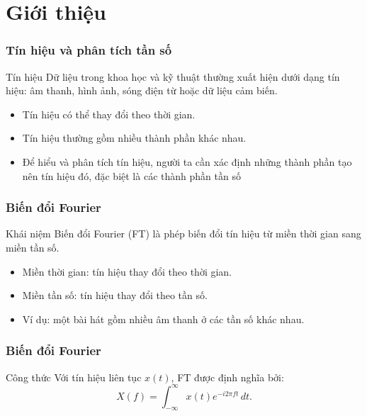 \section{Giới thiệu}

\begin{frame}
  \frametitle{Tín hiệu và phân tích tần số}

  \begin{block}{Tín hiệu}
    Dữ liệu trong khoa học và kỹ thuật thường xuất hiện dưới dạng tín hiệu:
    âm thanh, hình ảnh, sóng điện từ hoặc dữ liệu cảm biến.
  \end{block}

  \onslide<+->
  \begin{itemize}[<+->]
    \item Tín hiệu có thể thay đổi theo thời gian.
    \item Tín hiệu thường gồm nhiều thành phần khác nhau.
    \item Để hiểu và phân tích tín hiệu, người ta cần xác định những thành
    phần tạo nên tín hiệu đó, đặc biệt là các thành phần tần số
  \end{itemize}
\end{frame}

\begin{frame}
  \frametitle{Biến đổi Fourier}

  \begin{block}{Khái niệm}
    Biến đổi Fourier (FT) là phép biến đổi tín hiệu từ miền thời gian sang
    miền tần số.
  \end{block}

  \onslide<+->
  \begin{itemize}[<+->]
    \item Miền thời gian: tín hiệu thay đổi theo thời gian.
    \item Miền tần số: tín hiệu thay đổi theo tần số.
    \item Ví dụ: một bài hát gồm nhiều âm thanh ở các tần số khác nhau.
  \end{itemize}
\end{frame}

\begin{frame}
  \frametitle{Biến đổi Fourier}

  \begin{block}{Công thức}
    Với tín hiệu liên tục $x(t)$, FT được định nghĩa bởi:
    \begin{equation}
      X(f) = \int_{-\infty}^{\infty} x(t)e^{-i2\pi ft}\,dt.
    \end{equation}
  \end{block}
\end{frame}



